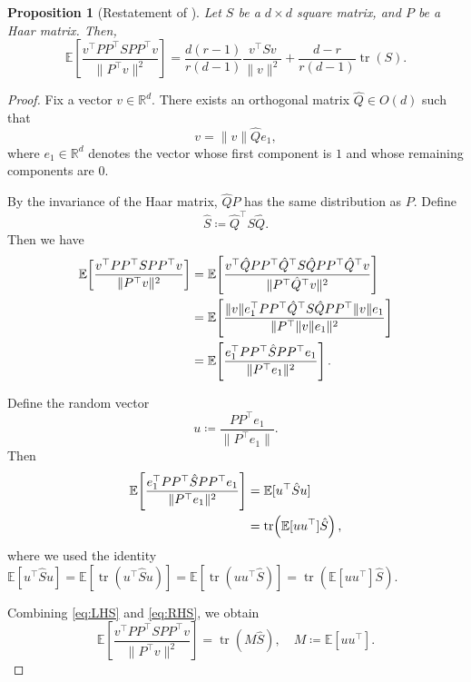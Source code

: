 \documentclass[10pt,a4paper]{amsart}
\newtheorem{proposition}{Proposition}
\begin{document}
\begin{proposition}[Restatement of ]
\label{app:prop:secondterm}
Let $S$ be a $d\times d$ square matrix, and $P$ be a Haar matrix. Then,
\[
\mathbb{E}\left[\frac{v^\top PP^\top S PP^\top v}{\|P^\top v\|^2}\right]
=
\frac{d(r-1)}{r(d-1)}\frac{v^\top Sv}{\|v\|^2}
+\frac{d-r}{r(d-1)}\operatorname{tr}(S).
\]
\end{proposition}

\begin{proof}
Fix a vector $v \in \mathbb{R}^d$.  
There exists an orthogonal matrix $\hat Q \in O(d)$ such that
\[
v = \|v\| \hat Q e_1,
\]
where $e_1 \in \mathbb{R}^d$ denotes the vector whose first component is $1$ and whose remaining components are $0$.

By the invariance of the Haar matrix, $\hat Q P$ has the same distribution as $P$.  
Define
\[
\hat S \coloneqq \hat Q^\top S \hat Q .
\]
Then we have
\begin{align}
\mathbb{E}\!\left[\frac{v^\top PP^\top S PP^\top v}{\|P^\top v\|^2}\right]
&= \mathbb{E}\!\left[\frac{v^\top \hat Q PP^\top \hat Q^\top S \hat Q PP^\top \hat Q^\top v}{\|P^\top \hat Q^\top v\|^2}\right] \notag\\
&= \mathbb{E}\!\left[\frac{\|v\| e_1^\top PP^\top \hat Q^\top S \hat Q PP^\top \|v\| e_1}{\|P^\top \|v\| e_1\|^2}\right] \notag\\
&= \mathbb{E}\!\left[\frac{e_1^\top PP^\top \hat S PP^\top e_1}{\|P^\top e_1\|^2}\right].
\label{eq:LHS}
\end{align}

Define the random vector
\[
u \coloneqq \frac{PP^\top e_1}{\|P^\top e_1\|}.
\]
Then
\begin{align}
\mathbb{E}\!\left[\frac{e_1^\top PP^\top \hat S PP^\top e_1}{\|P^\top e_1\|^2}\right]
&= \mathbb{E}[u^\top \hat S u] \notag\\
&= \operatorname{tr}\!\left(\mathbb{E}[uu^\top]\hat S\right),
\label{eq:RHS}
\end{align}
where we used the identity
$\mathbb{E}[u^\top \hat S u]
= \mathbb{E}[\operatorname{tr}(u^\top \hat S u)]
= \mathbb{E}[\operatorname{tr}(uu^\top \hat S)]
= \operatorname{tr}(\mathbb{E}[uu^\top]\hat S)$.

Combining \eqref{eq:LHS} and \eqref{eq:RHS}, we obtain
\[
\mathbb{E}\!\left[\frac{v^\top PP^\top S PP^\top v}{\|P^\top v\|^2}\right]
= \operatorname{tr}(M\hat S),
\quad
M \coloneqq \mathbb{E}[uu^\top].
\]


\end{proof}
\end{document}
